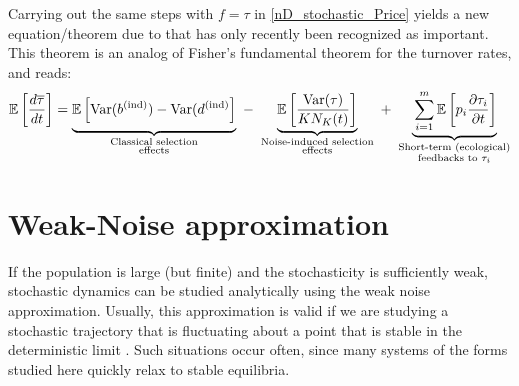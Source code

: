 Carrying out the same steps with $f = \tau$ in \eqref{nD_stochastic_Price} yields a new equation/theorem due to \cite{kuosmanen_turnover_2022} that has only recently been recognized as important. This theorem is an analog of Fisher's fundamental theorem for the turnover rates, and reads:
\begin{equation}
\label{nD_stochastic_Fisher_turnover}
\mathbb{E}\left[\frac{d\overline{\tau}}{dt}\right] = \underbrace{ \vphantom{ \mathbb{E}\left[\frac{\textrm{Var}(\tau)}{KN_K(t)}\right] } \mathbb{E}\left[\textrm{Var}(b^{\textrm{(ind)}}) - \textrm{Var}(d^{\textrm{(ind)}}\right]}_{\substack{\text{Classical selection} \\ \text{effects}}} \ - \ \underbrace{ \mathbb{E}\left[\frac{\textrm{Var}(\tau)}{KN_K(t)}\right]}_{\substack{\text{Noise-induced selection} \\ \text{effects}}} \ + \ \underbrace{ \vphantom{ \mathbb{E}\left[\frac{\textrm{Var}(\tau)}{KN_K(t)}\right] } \sum\limits_{i=1}^{m}\mathbb{E}\left[p_i\frac{\partial \tau_i}{\partial t}\right]}_{\substack{\text{Short-term (ecological)} \\ \text{feedbacks to $\tau_i$}}}
\end{equation}

\section{Weak-Noise approximation}
If the population is large (but finite) and the stochasticity is sufficiently weak, stochastic dynamics can be studied analytically using the weak noise approximation. Usually, this approximation is valid if we are studying a stochastic trajectory that is fluctuating about a point that is stable in the deterministic limit \citep{van_kampen_stochastic_1981}. Such situations occur often, since many systems of the forms studied here quickly relax to stable equilibria.
\clearpage

